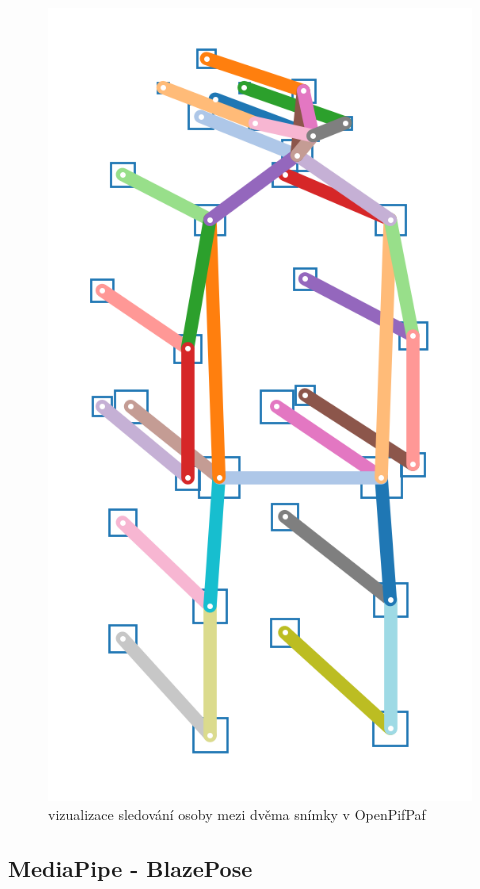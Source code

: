 \begin{figure}[]
    \centering
    \includegraphics[height=0.2\textheight]{Figures/skeleton_forward2.png}
    \caption{vizualizace  sledování osoby mezi dvěma snímky v OpenPifPaf \cite{openpifpaf}}
    \label{fig:pipaf-tracking}
\end{figure}

\subsection{MediaPipe - BlazePose}

